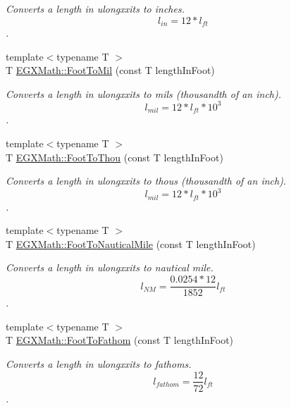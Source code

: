 \begin{DoxyCompactItemize}
\begin{DoxyCompactList}\small\item\em Converts a length in ulongxxits to inches. \[ l_{in}=12 * l_{ft} \]. \end{DoxyCompactList}\item 
{\footnotesize template$<$typename T $>$ }\\T \mbox{\hyperlink{group___e_g_x_math-_conversions-_length_conversions-_imperial-_foot-_imperial_gab25e7780b3c0429c1a05eafbcbe322a5}{E\+G\+X\+Math\+::\+Foot\+To\+Mil}} (const T length\+In\+Foot)
\begin{DoxyCompactList}\small\item\em Converts a length in ulongxxits to mils (thousandth of an inch). \[ l_{mil}=12 * l_{ft} * 10^{3} \]. \end{DoxyCompactList}\item 
{\footnotesize template$<$typename T $>$ }\\T \mbox{\hyperlink{group___e_g_x_math-_conversions-_length_conversions-_imperial-_foot-_imperial_gab8b02110f4657f92b7de8a42b9494017}{E\+G\+X\+Math\+::\+Foot\+To\+Thou}} (const T length\+In\+Foot)
\begin{DoxyCompactList}\small\item\em Converts a length in ulongxxits to thous (thousandth of an inch). \[ l_{mil}=12 * l_{ft} * 10^{3} \]. \end{DoxyCompactList}\item 
{\footnotesize template$<$typename T $>$ }\\T \mbox{\hyperlink{group___e_g_x_math-_conversions-_length_conversions-_imperial-_foot-_nautical_ga2b73f417fb0e4bcb50bdf79594088a75}{E\+G\+X\+Math\+::\+Foot\+To\+Nautical\+Mile}} (const T length\+In\+Foot)
\begin{DoxyCompactList}\small\item\em Converts a length in ulongxxits to nautical mile. \[ l_{NM}= \frac{0.0254 * 12}{1852} l_{ft} \]. \end{DoxyCompactList}\item 
{\footnotesize template$<$typename T $>$ }\\T \mbox{\hyperlink{group___e_g_x_math-_conversions-_length_conversions-_imperial-_foot-_nautical_gaf0a9ed2bf09d2f5f4099c96c702853d0}{E\+G\+X\+Math\+::\+Foot\+To\+Fathom}} (const T length\+In\+Foot)
\begin{DoxyCompactList}\small\item\em Converts a length in ulongxxits to fathoms. \[ l_{fathom}= \frac{12}{72} l_{ft} \]. \end{DoxyCompactList}\item 

\end{DoxyCompactItemize}
